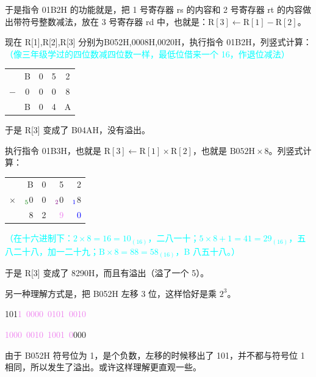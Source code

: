 \documentclass[UTF8]{ctexart}
\begin{document}
于是指令 01B2H 的功能就是，把 1 号寄存器 rs 的内容和 2 号寄存器 rt 的内容做出带符号整数减法，放在 3 号寄存器 rd 中，也就是：$\mathrm{R[3] \gets R[1] - R[2]}$。

现在 R[1],R[2],R[3] 分别为B052H,0008H,0020H，执行指令 01B2H，列竖式计算：\textcolor{cyan}{（像三年级学过的四位数减四位数一样，最低位借来一个 16，作退位减法）}
\begin{table}[H]
  \centering
  \begin{tabular}{ccccc}
      & B & 0 & 5 & 2 \\
  $-$ & 0 & 0 & 0 & 8 \\
  \hline
      & B & 0 & 4 & A \\
  \end{tabular}
\end{table}
于是 R[3] 变成了 B04AH，没有溢出。

执行指令 01B3H，也就是 $\mathrm{R[3]\gets R[1]\times R[2]}$，也就是 $\mathrm{B052H\times 8}$。列竖式计算：
\begin{table}[H]
  \centering
  \begin{tabular}{crrrr}
           & B & 0 & 5 & 2 \\
  $\times$ & $_{\textcolor{green!50!black}{5}}$0 & 0 & $_{\textcolor{violet}{2}}$0 & $_{\textcolor{blue}{1}}$8 \\
  \hline
           & \textcolor{green!50!black}{8} & 2 & \textcolor{violet}{9} & \textcolor{blue}{0} \\
  \end{tabular}
\end{table}

\textcolor{cyan}{（在十六进制下：$2\times 8 = 16 = 10_{(16)}$，二八一十；$5\times 8 + 1= 41 = 29_{(16)}$，五八二十八，加一二十九；$\mathrm{B}\times 8 = 88 = 58_{(16)}$，B 八五十八。）}

于是 R[3] 变成了 8290H，而且有溢出（溢了一个 5）。

\begin{tcolorbox}[colback=violet!5, colframe=violet, boxrule=1pt, ]
\small
另一种理解方式是，把 B052H 左移 3 位，这样恰好是乘 $2^3$。
\begin{center}
    101\textcolor{violet}{1\ 0000\ 0101\ 0010} 
    
    \textcolor{violet}{1000\ 0010\ 1001\ 0}000 
\end{center}
由于 B052H 符号位为 1，是个负数，左移的时候移出了 101，并不都与符号位 1 相同，所以发生了溢出。或许这样理解更直观一些。

\end{tcolorbox}
\end{document}
